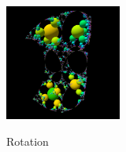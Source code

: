 \begin{figure}[h!tbp]
\begin{minipage}[]{0.49\hsize}
  \begin{minipage}[]{0.24\hsize}
   \center
   \includegraphics[width=1.5in, height=1.5in, keepaspectratio]{../img/klein/3diis/rotationOrb.pdf}
   \label{fig:rotationOrb}
  \end{minipage}
  \hspace*{\fill}
  \caption{Rotation}
  \label{fig:rotation3d}
 \end{minipage}
\end{figure}

